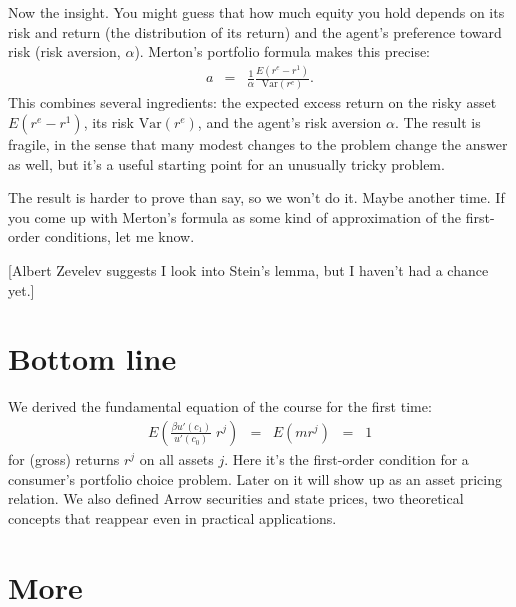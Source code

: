 \documentclass[11pt]{article}
\begin{document}
Now the insight.  You might guess that how much equity you hold
depends on its risk and return (the distribution of its return)
and the agent's preference toward risk (risk aversion, $\alpha$).
Merton's portfolio formula makes this precise:
\begin{eqnarray*}
    a &=& \frac{1}{\alpha} \frac{E (r^e - r^1)}{\mbox{Var}(r^e)} .
\end{eqnarray*}
This combines several ingredients:
the expected excess return on the risky asset $E (r^e - r^1)$,
its risk $\mbox{Var}(r^e)$,
and the agent's risk aversion $\alpha$.
The result is fragile, in the sense that many modest changes to the problem
change the answer as well,
but it's a useful starting point for an unusually tricky problem.

The result is harder to prove than say, so we won't do it.
Maybe another time.
If you come up with Merton's formula as some kind of approximation
of the first-order conditions, let me know.

[Albert Zevelev suggests I look into Stein's lemma, but I haven't
had a chance yet.]

\begin{comment}
Merton derived it in continuous time using a set of tools
we will diligently avoid.
Here we might start with the lognormal assumption.
Let us say that $x = \log r^e - \log r^1 \sim \mathcal{N}(\kappa_1,\kappa_2)$.
Then $r^e = r^1 e^x$ and
$r^e-r^1 = r^1 (e^x-1)$.
\end{comment}


\section*{Bottom line}

We derived the fundamental equation of the course for the first time:
\begin{eqnarray*}
    E \left( \frac{\beta u'(c_1)}{u'(c_0)}\; r^j \right) &=&
        E \left( m r^j \right) \;\;=\;\;  1
\end{eqnarray*}
for (gross) returns $r^j$ on all assets $j$.
Here it's the first-order condition for a consumer's portfolio choice
problem.
Later on it will show up as an asset pricing relation.
We also defined Arrow securities and state prices,
two theoretical concepts that reappear even in practical applications.

\section*{More}
\end{document}
